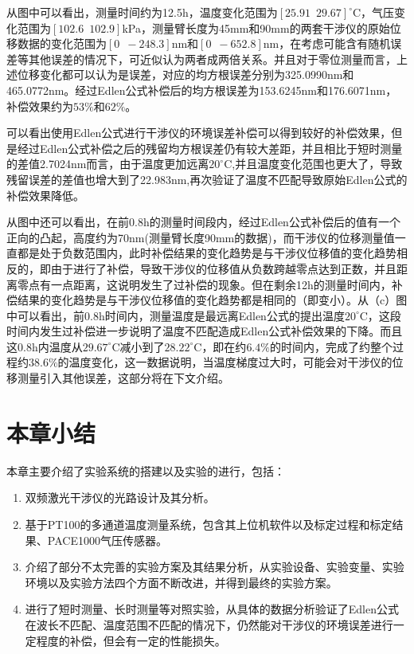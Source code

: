 从图中可以看出，测量时间约为12.5h，温度变化范围为$[25.91\,\,\,29.67]^{\circ} \mathrm{C}$，气压变化范围为$[102.6\,\,\,102.9]$kPa，测量臂长度为45mm和90mm的两套干涉仪的原始位移数据的变化范围为$[0 \,\,\, -248.3]$nm和$[0\,\,\,-652.8]$nm，在考虑可能含有随机误差等其他误差的情况下，可近似认为两者成两倍关系。并且对于零位测量而言，上述位移变化都可以认为是误差，对应的均方根误差分别为325.0990nm和465.0772nm。经过Edlen公式补偿后的均方根误差为153.6245nm和176.6071nm，补偿效果约为$53\%$和$62\%$。

可以看出使用Edlen公式进行干涉仪的环境误差补偿可以得到较好的补偿效果，但是经过Edlen公式补偿之后的残留均方根误差仍有较大差距，并且相比于短时测量的差值2.7024nm而言，由于温度更加远离$20^{\circ} \mathrm{C}$,并且温度变化范围也更大了，导致残留误差的差值也增大到了22.983nm,再次验证了温度不匹配导致原始Edlen公式的补偿效果降低。

从图中还可以看出，在前0.8h的测量时间段内，经过Edlen公式补偿后的值有一个正向的凸起，高度约为70nm(测量臂长度90mm的数据)，而干涉仪的位移测量值一直都是处于负数范围内，此时补偿结果的变化趋势是与干涉仪位移值的变化趋势相反的，即由于进行了补偿，导致干涉仪的位移值从负数跨越零点达到正数，并且距离零点有一点距离，这说明发生了过补偿的现象。但在剩余12h的测量时间内，补偿结果的变化趋势是与干涉仪位移值的变化趋势都是相同的（即变小）。从（c）图中可以看出，前0.8h时间内，测量温度是最远离Edlen公式的提出温度$20^{\circ} \mathrm{C}$，这段时间内发生过补偿进一步说明了温度不匹配造成Edlen公式补偿效果的下降。而且这0.8h内温度从$29.67^{\circ} \mathrm{C}$减小到了$28.22^{\circ} \mathrm{C}$，即在约$6.4\%$的时间内，完成了约整个过程约$38.6\%$的温度变化，这一数据说明，当温度梯度过大时，可能会对干涉仪的位移测量引入其他误差，这部分将在下文介绍。

\section{本章小结}
本章主要介绍了实验系统的搭建以及实验的进行，包括：
\begin{enumerate}
  \item 双频激光干涉仪的光路设计及其分析。
  \item 基于PT100的多通道温度测量系统，包含其上位机软件以及标定过程和标定结果、PACE1000气压传感器。
  \item 介绍了部分不太完善的实验方案及其结果分析，从实验设备、实验变量、实验环境以及实验方法四个方面不断改进，并得到最终的实验方案。
  \item 进行了短时测量、长时测量等对照实验，从具体的数据分析验证了Edlen公式在波长不匹配、温度范围不匹配的情况下，仍然能对干涉仪的环境误差进行一定程度的补偿，但会有一定的性能损失。
\end{enumerate}
